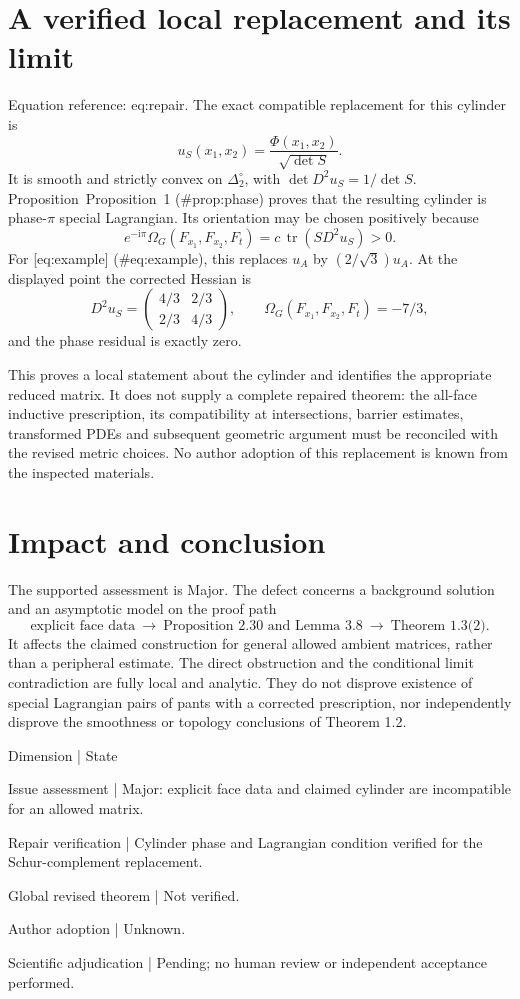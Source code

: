 \documentclass[10pt]{article}
\begin{document}
\section*{A verified local replacement and its limit}
Equation reference: eq:repair. The exact compatible replacement for this cylinder is \[
 u_S(x_1,x_2)=\frac{\Phi(x_1,x_2)}{\sqrt{\det S}}.\] It is smooth and strictly convex on \(\Delta_2^\circ\), with \(\det D^2u_S=1/\det S\). Proposition Proposition 1 (\#prop:phase) proves that the resulting cylinder is phase-\(\pi\) special Lagrangian. Its orientation may be chosen positively because \[e^{-\mathrm i\pi}\Omega_G(F_{x_1},F_{x_2},F_t)
     =c\,\operatorname{tr}(SD^2u_S)>0.\] For [eq:example] (\#eq:example), this replaces \(u_A\) by \((2/\sqrt3)u_A\). At the displayed point the corrected Hessian is \[D^2u_S=\begin{pmatrix}4/3&2/3\\2/3&4/3\end{pmatrix},
 \qquad
 \Omega_G(F_{x_1},F_{x_2},F_t)=-7/3,\] and the phase residual is exactly zero.\par
This proves a local statement about the cylinder and identifies the appropriate reduced matrix. It does not supply a complete repaired theorem: the all-face inductive prescription, its compatibility at intersections, barrier estimates, transformed PDEs and subsequent geometric argument must be reconciled with the revised metric choices. No author adoption of this replacement is known from the inspected materials.\par
\section*{Impact and conclusion}
The supported assessment is Major. The defect concerns a background solution and an asymptotic model on the proof path \[\text{explicit face data}
 \ \longrightarrow\ \text{Proposition 2.30 and Lemma 3.8}
 \ \longrightarrow\ \text{Theorem 1.3(2)}.\] It affects the claimed construction for general allowed ambient matrices, rather than a peripheral estimate. The direct obstruction and the conditional limit contradiction are fully local and analytic. They do not disprove existence of special Lagrangian pairs of pants with a corrected prescription, nor independently disprove the smoothness or topology conclusions of Theorem 1.2.\par
Dimension | State\par
Issue assessment | Major: explicit face data and claimed cylinder are incompatible for an allowed matrix.\par
Repair verification | Cylinder phase and Lagrangian condition verified for the Schur-complement replacement.\par
Global revised theorem | Not verified.\par
Author adoption | Unknown.\par
Scientific adjudication | Pending; no human review or independent acceptance performed.\par
\end{document}
